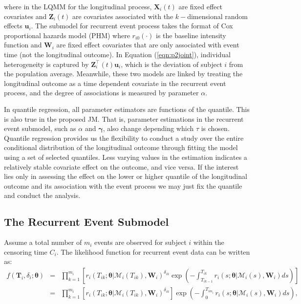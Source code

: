 \noindent where in the LQMM for the longitudinal process, $\boldsymbol{X}_{i}(t)$ are fixed effect covariates and $\boldsymbol{Z}_{i}(t)$ are covariates associated with the $k-$dimensional random effects $\boldsymbol{u}_i$. The submodel for recurrent event process takes the format of Cox proportional hazards model (PHM) where $r_{i0}(\cdot)$ is the baseline intensity function and $\boldsymbol{W}_{i}$ are fixed effect covariates that are only associated with event time (not the longitudinal outcome). In Equation (\ref{eqn:p2joint}), individual heterogeneity is captured by ${\boldsymbol Z}_{i}^{\top}(t){\boldsymbol u}_i$, which is the deviation of subject $i$ from the population average. Meanwhile, these two models are linked by treating the longitudinal outcome as a time dependent covariate in the recurrent event process, and the degree of associations is measured by parameter $\alpha$.

In quantile regression, all parameter estimators are functions of the quantile. This is also true in the proposed JM. That is, parameter estimations in the recurrent event submodel, such as $\alpha$ and $\boldsymbol{\gamma}$, also change depending which $\tau$ is chosen. Quantile regression provides us the flexibility to conduct a study over the entire conditional distribution of the longitudinal outcome through fitting the model using a set of selected quantiles. Less varying values in the estimation indicates a relatively stable covariate effect on the outcome, and vice versa. If the interest lies only in assessing the effect on the lower or higher quantile of the longitudinal outcome and its association with the event process we may just fix the quantile and conduct the analysis.

\subsection{The Recurrent Event Submodel}\label{sec:p2surv_submodel}
Assume a total number of $m_i$ events are observed for subject $i$ within the censoring time $C_i$. The likelihood function for recurrent event data can be written as:
\begin{eqnarray}\label{eqn:p2lik_sur}
f({\boldsymbol T}_i, \delta_i;\boldsymbol{\theta})&=& \nonumber \prod_{k=1}^{m_i}\left[r_i(T_{ik};\boldsymbol{\theta}|\mathcal{M}_{i}(T_{ik}), \boldsymbol{W}_i)^{\delta_{ik}}\exp\left(-\int_{T_{ik-1}}^{T_{ik}}r_i(s;\boldsymbol{\theta}|\mathcal{M}_{i}(s), \boldsymbol{W}_i)ds\right)\right]\\
&=& \prod_{k=1}^{m_i}\left[r_i(T_{ik};\boldsymbol{\theta}|\mathcal{M}_{i}(T_{ik}), \boldsymbol{W}_i)^{\delta_{ik}}\right]\exp\left(-\int_0^{T_{im_i}}r_i(s;\boldsymbol{\theta}|\mathcal{M}_{i}(s), \boldsymbol{W}_i)ds\right),
\end{eqnarray}

